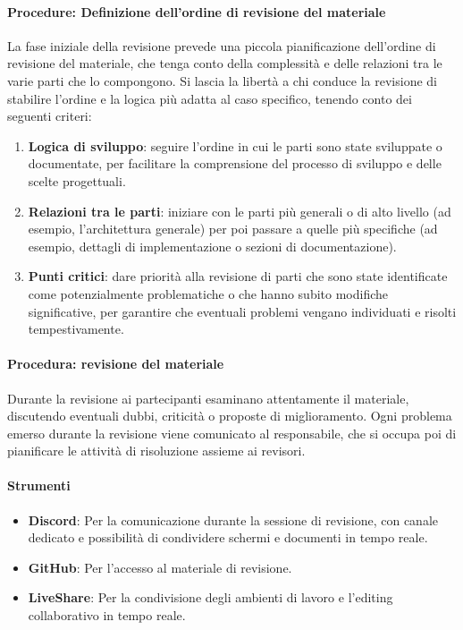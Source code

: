 \documentclass[a4paper,12pt]{article}
\begin{document}
\paragraph{Procedure: Definizione dell'ordine di revisione del materiale}
La fase iniziale della revisione prevede una piccola pianificazione dell'ordine
di revisione del materiale, che tenga conto della complessità e delle relazioni
tra le varie parti che lo compongono. Si lascia la libertà a chi conduce la
revisione di stabilire l'ordine e la logica più adatta al caso specifico,
tenendo conto dei seguenti criteri:
\begin{enumerate}
    \item \textbf{Logica di sviluppo}: seguire l'ordine in cui le parti sono state sviluppate o documentate, per facilitare la comprensione del processo di sviluppo e delle scelte progettuali.
    \item \textbf{Relazioni tra le parti}: iniziare con le parti più generali o di alto livello (ad esempio, l'architettura generale) per poi passare a quelle più specifiche (ad esempio, dettagli di implementazione o sezioni di documentazione).
    \item \textbf{Punti critici}: dare priorità alla revisione di parti che sono state identificate come potenzialmente problematiche o che hanno subito modifiche significative, per garantire che eventuali problemi vengano individuati e risolti tempestivamente.
\end{enumerate}

\paragraph{Procedura: revisione del materiale}
Durante la revisione ai partecipanti esaminano attentamente il materiale,
discutendo eventuali dubbi, criticità o proposte di miglioramento. Ogni
problema emerso durante la revisione viene comunicato al responsabile, che si
occupa poi di pianificare le attività di risoluzione assieme ai revisori.

\paragraph{Strumenti}
\begin{itemize}
    \item \textbf{Discord}: Per la comunicazione durante la sessione di revisione, con canale dedicato e possibilità di condividere schermi e documenti in tempo reale.
    \item \textbf{GitHub}: Per l'accesso al materiale di revisione.
    \item \textbf{LiveShare}: Per la condivisione degli ambienti di lavoro e l'editing collaborativo in tempo reale.
\end{itemize}
\end{document}
